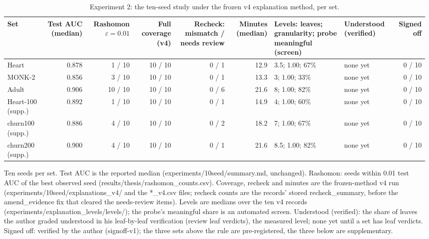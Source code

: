 \begin{table}[htbp]
\centering
\small
\caption{Experiment 2: the ten-seed study under the frozen v4 explanation method, per set.}
\label{tab:ch7-exp2-consistency}
\begin{tabular}{lrrrrrp{3.0cm}p{1.6cm}r}
\toprule
Set & Test AUC (median) & Rashomon $\varepsilon=0.01$ & Full coverage (v4) & Recheck: mismatch / needs review & Minutes (median) & Levels: leaves; granularity; probe meaningful (screen) & Understood (verified) & Signed off \\
\midrule
Heart & 0.878 & 1 / 10 & 10 / 10 & 0 / 1 & 12.9 & 3.5; 1.00; 67\% & none yet & 0 / 10 \\
MONK-2 & 0.856 & 3 / 10 & 10 / 10 & 0 / 1 & 13.3 & 3; 1.00; 33\% & none yet & 0 / 10 \\
Adult & 0.906 & 10 / 10 & 10 / 10 & 0 / 6 & 21.6 & 8; 1.00; 82\% & none yet & 0 / 10 \\
\midrule
Heart-100 (supp.) & 0.892 & 1 / 10 & 10 / 10 & 0 / 1 & 14.9 & 4; 1.00; 60\% & none yet & 0 / 10 \\
churn100 (supp.) & 0.886 & 4 / 10 & 10 / 10 & 0 / 2 & 18.2 & 7; 1.00; 67\% & none yet & 0 / 10 \\
churn200 (supp.) & 0.900 & 4 / 10 & 10 / 10 & 0 / 1 & 21.6 & 8.5; 1.00; 82\% & none yet & 0 / 10 \\
\bottomrule
\end{tabular}
\begin{flushleft}\footnotesize Ten seeds per set. Test AUC is the reported median (experiments/10seed/summary.md, unchanged). Rashomon: seeds within 0.01 test AUC of the best observed seed (results/thesis/rashomon\_counts.csv). Coverage, recheck and minutes are the frozen-method v4 run (experiments/10seed/explanations\_v4/ and the *\_v4.csv files; recheck counts are the records' stored recheck\_summary, before the amend\_evidence fix that cleared the needs-review items). Levels are medians over the ten v4 records (experiments/explanation\_levels/levels/); the probe's meaningful share is an automated screen. Understood (verified): the share of leaves the author graded understood in his leaf-by-leaf verification (review leaf verdicts), the measured level; none yet until a set has leaf verdicts. Signed off: verified by the author (signoff-v1); the three sets above the rule are pre-registered, the three below are supplementary.\end{flushleft}
\end{table}
